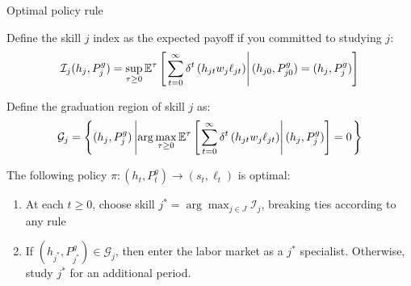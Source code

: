 \begin{frame}{Optimal policy rule}

Define the skill $j$ index as the expected payoff if you committed to studying $j$:
\begin{equation*}
\mathcal{I}_j (h_j, P_j^g) = \sup_{\tau \geq 0} \mathbb{E}^\tau
\left[\left. 
   \sum_{t=0}^\infty \delta^t \left( h_{jt} w_j \ell_{jt}  \right) \right\vert (h_{j0}, P_{j0}^g) = (h_j, P_j^g)
 \right]
\end{equation*}

Define the graduation region of skill $j$ as: 
\begin{equation*}
\mathcal{G}_j = \left\{ (h_j, P_j^g) \left\vert
   \arg \max_{\tau \geq 0} 
   \mathbb{E}^\tau \left[\left. \sum_{t=0}^\infty \delta^t \left( h_{jt} w_j \ell_{jt}  \right) \right\vert (h_j, P_j^g) \right] = 0
   \right. \right\}
\end{equation*}

The following policy $\pi: (h_t, P_t^g) \to (s_t, \ell_t)$ is optimal: 
\begin{enumerate}
    \item At each $t \geq 0$, choose skill $j^* = \arg \max_{j \in J} \mathcal{I}_j$, breaking ties according to any rule
    \item If $(h_{j^*}, P_{j^*}^g) \in \mathcal{G}_{j}$, then enter the labor market as a $j^*$ specialist. Otherwise, study $j^*$ for an additional period.  
\end{enumerate}

\end{frame}



